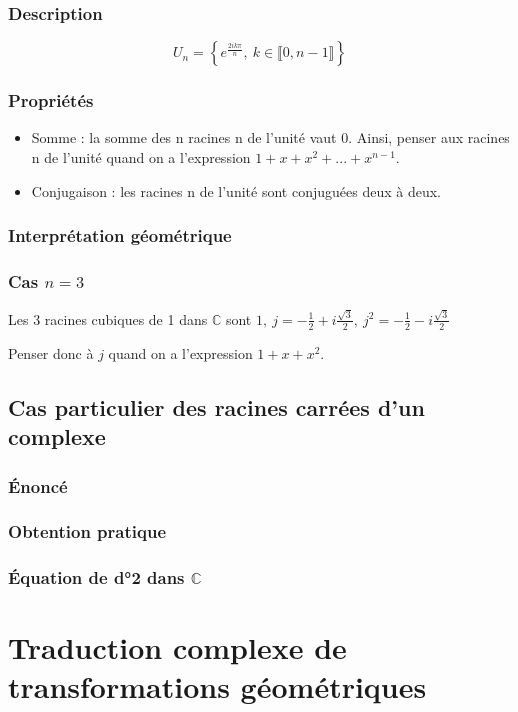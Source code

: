 \documentclass[12pt,a4paper,french]{book}
\begin{document}
			\subsubsection{Description}
			\[U_n = \left\{e^{\frac{2ik\pi}{n}},\ k \in \llbracket 0,n-1 \rrbracket \right\}\]
			\subsubsection{Propriétés}
			\begin{itemize}
				\item Somme : la somme des n racines n de l'unité vaut 0. Ainsi, penser aux racines n de l'unité quand on a l'expression $1 + x + x^2 + ... + x^{n-1}$.
				\item Conjugaison : les racines n de l'unité sont conjuguées deux à deux.
			\end{itemize}
			
			\subsubsection{Interprétation géométrique}
			\subsubsection{Cas $n=3$}
			Les 3 racines cubiques de 1 dans $\mathbb{C}$ sont $1,\ j = -\frac{1}{2}+i\frac{\sqrt{3}}{2},\ j^2 = -\frac{1}{2}-i\frac{\sqrt{3}}{2}$
			
			Penser donc à $j$ quand on a l'expression $1+x+x^2$.
		\subsection{Cas particulier des racines carrées d'un complexe}
			\subsubsection{Énoncé}
			\subsubsection{Obtention pratique}
			\subsubsection{Équation de d°2 dans $\mathbb{C}$}
	\section{Traduction complexe de transformations géométriques}
\end{document}
